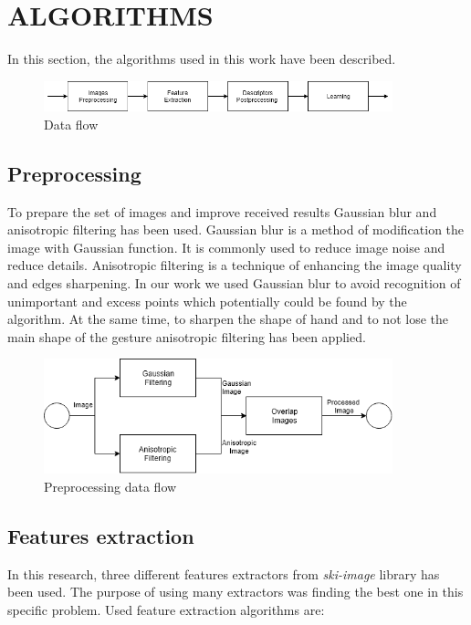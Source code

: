 \documentclass[11pt,a4paper]{article}
\begin{document}
\section{ALGORITHMS}

	In this section, the algorithms used in this work have been described.
	\begin{figure}[H]
		\centering
		\includegraphics[width=0.9\textwidth]{Algorithm.png}
		\caption{Data flow}
		\label{fig:Algorithm}
	\end{figure} 

\subsection{Preprocessing}
	
	To prepare the set of images and improve received results Gaussian blur and anisotropic filtering has been used. Gaussian blur is a method of modification the image with Gaussian function. It is commonly used to reduce image noise and reduce details. Anisotropic filtering is a technique of enhancing the image quality and edges sharpening. In our work we used Gaussian blur to avoid recognition of unimportant and excess points which potentially could be found by the algorithm. At the same time, to sharpen the shape of hand and to not lose the main shape of the gesture anisotropic filtering has been applied.
	
	
	\begin{figure}[H]
		\centering
		\includegraphics[width=0.9\textwidth]{Preprocessing.png}
		\caption{Preprocessing data flow}
		\label{fig:Preprocessing}
	\end{figure}

\subsection{Features extraction}

In this research, three different features extractors from \textit{ski-image} library has been used. The purpose of using many extractors was finding the best one in this specific problem. Used feature extraction algorithms are:
\end{document}

